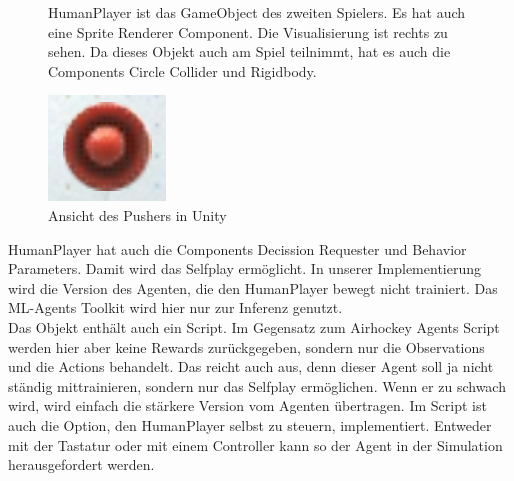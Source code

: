 \begin{figure} [h]

\begin{minipage}[t]{0.6\textwidth}
\vspace{0pt}
HumanPlayer ist das GameObject des zweiten Spielers. Es hat auch eine Sprite Renderer Component. Die Visualisierung ist rechts zu sehen. Da dieses Objekt auch am Spiel teilnimmt, hat es auch die Components Circle Collider und Rigidbody.
\end{minipage}
\hspace{0.1\textwidth}
\begin{minipage}[t]{0.2\textwidth}
\vspace{0pt}
\includegraphics[width=\textwidth]{images/pusher_unity}
 \caption{Ansicht des Pushers in Unity}
 \label{unity_pusher}
\end{minipage}
\end{figure}

HumanPlayer hat auch die Components Decission Requester und Behavior Parameters. Damit wird das Selfplay ermöglicht. In unserer Implementierung wird die Version des Agenten, die den HumanPlayer bewegt nicht trainiert. Das ML-Agents Toolkit wird hier nur zur Inferenz genutzt. \\
Das Objekt enthält auch ein Script. Im Gegensatz zum Airhockey Agents Script werden hier aber keine Rewards zurückgegeben, sondern nur die Observations und die Actions behandelt. Das reicht auch aus, denn dieser Agent soll ja nicht ständig mittrainieren, sondern nur das Selfplay ermöglichen. Wenn er zu schwach wird, wird einfach die stärkere Version vom Agenten übertragen. Im Script ist auch die Option, den HumanPlayer selbst zu steuern, implementiert. Entweder mit der Tastatur oder mit einem Controller kann so der Agent in der Simulation herausgefordert werden. \\

